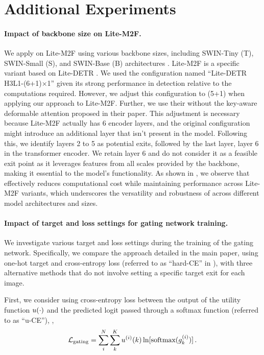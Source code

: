 \section{Additional Experiments}

\paragraph{Impact of backbone size on Lite-M2F.} We apply {\ours} on Lite-M2F using various backbone sizes, including SWIN-Tiny (T), SWIN-Small (S), and SWIN-Base (B) architectures \cite{liu2021swin}. Lite-M2F is a specific variant based on Lite-DETR \cite{li2023lite}. We used the configuration named ``Lite-DETR H3L1-(6+1)$\times$1'' given its strong performance in detection relative to the computations required. However, we adjust this configuration to (5+1) when applying our approach to Lite-M2F. Further, we use their without the key-aware deformable attention  \cite{li2023lite} proposed in their paper. This adjustment is necessary because Lite-M2F actually has 6 encoder layers, and the original configuration might introduce an additional layer that isn't present in the model. Following this, we identify layers 2 to 5 as potential exits, followed by the last layer, layer 6 in the transformer encoder. We retain layer 6 and do not consider it as a feasible exit point as it leverages features from all scales provided by the backbone, making it essential to the model's functionality. As shown in , we observe that {\ours} effectively reduces computational cost while maintaining performance across Lite-M2F variants, which underscores the versatility and robustness of {\ours} across different model architectures and sizes.
%
\paragraph{Impact of target and loss settings for gating network training.} We investigate various target and loss settings during the training of the gating network. Specifically, we compare the approach detailed in the main paper, using one-hot target and cross-entropy loss (referred to as ``hard-CE'' in ), with three alternative methods that do not involve setting a specific target exit for each image.

First, we consider using cross-entropy loss between the output of the utility function $u(\cdot)$ and the predicted logit passed through a softmax function (referred to as ``u-CE''), \ie, 
\[
\mathcal{L}_\text{gating}=\sum_i^N\sum_{k}^{K}u^{(i)}(k)\ln [\text{softmax}(g_k^{(i)})]\,.
\]

